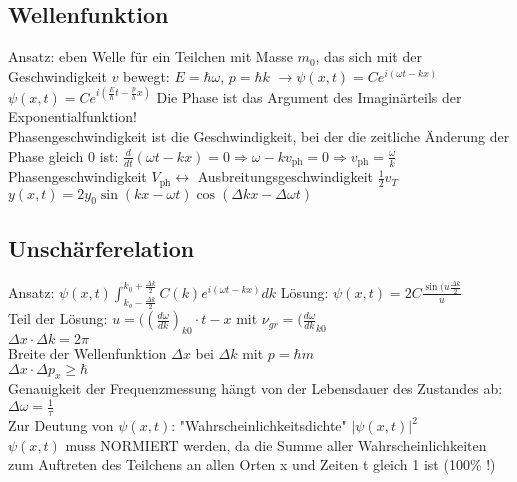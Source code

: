 \documentclass[fs, footer]{latex4ei}
\begin{document}
\begin{multicols*}{4}
\subsection{Wellenfunktion}
Ansatz: eben Welle für ein Teilchen mit Masse $m_0$, das sich mit der Geschwindigkeit $v$ bewegt: $E = \hbar\omega$, $p =\hbar k$ $\rightarrow \psi(x,t) = Ce^{i(\omega t-kx)}$\\
$\psi(x,t) = Ce^{i(\frac{E}{\hbar}t - \frac{p}{h}x)}$ Die Phase ist das Argument des Imaginärteils der Exponentialfunktion!\\
Phasengeschwindigkeit ist die Geschwindigkeit, bei der die zeitliche Änderung der Phase gleich 0 ist:
 $\frac{d}{dt}(\omega t - kx) = 0 \Rightarrow \omega - kv_{\text{ph}} = 0 \Rightarrow v_{\text{ph}} = \frac{\omega}{k}$\\
Phasengeschwindigkeit $V_{\text{ph}}  \leftrightarrow$ Ausbreitungsgeschwindigkeit $\frac{1}{2}v_T$\\
$y(x,t) = 2y_0 \sin(kx-\omega t)\cos(\Delta kx - \Delta \omega t)$\\
\subsection{Unschärferelation}
Ansatz: $\psi(x,t)  \int_{k_o - \frac{\Delta k}{2}}^{k_0 + \frac{\Delta k}{2}} C(k)e^{i(\omega t - kx)} dk$
Lösung: $\psi(x,t) = 2C \frac{\sin(u\frac{\Delta k}{2}}{u}$\\
Teil der Lösung: $u = ( (\frac{d\omega}{dk})_{k0}\cdot t-x$ mit $\nu_{gr} = (\frac{d\omega}{dk}_{k0}$\\
$\Delta x\cdot \Delta k = 2\pi$\\
Breite der Wellenfunktion $\Delta x$ bei $\Delta k$ mit $p = \hbar m$\\
$\Delta x\cdot \Delta p_x \geq \hbar$\\
Genauigkeit der Frequenzmessung hängt von der Lebensdauer des Zustandes ab: $\Delta \omega = \frac{1}{\tau}$\\
Zur Deutung von $\psi(x,t)$:
"Wahrscheinlichkeitsdichte" $|\psi(x,t)|^2$\\ $\psi(x,t)$ muss NORMIERT werden, da die Summe aller Wahrscheinlichkeiten zum Auftreten des Teilchens an allen Orten x und Zeiten t gleich 1 ist (100\% !)\\


\end{multicols*}
\end{document}
